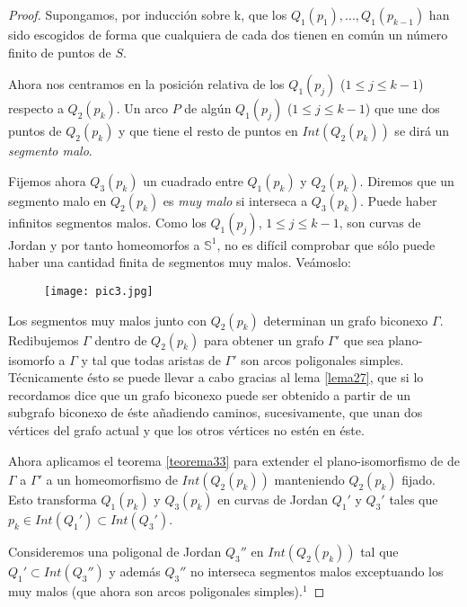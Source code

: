 \begin{proof}
	Supongamos, por inducción sobre k, que los $Q_{1}(p_{1}),...,Q_{1}(p_{k-1})$ han sido escogidos de forma que cualquiera de cada dos tienen en común un número finito de puntos de $S$. 

	Ahora nos centramos en la posición relativa de los $Q_{1}(p_j)$ ($1 \leq j \leq k-1$) respecto a $Q_{2}(p_k)$. Un arco $P$ de algún $Q_{1}(p_j)$ ($1 \leq j \leq k-1$) que une dos puntos de $Q_{2}(p_k)$ y que tiene el resto de puntos en $Int(Q_{2}(p_k))$ se dirá un 
 {\em segmento malo}. 
 
Fijemos ahora $Q_{3}(p_k)$ un cuadrado entre $Q_{1}(p_k)$ y $Q_{2}(p_k)$. Diremos que  un segmento malo en $Q_{2}(p_k)$ es {\em muy malo} si interseca a $Q_{3}(p_k)$. Puede haber infinitos segmentos malos. Como los $Q_{1}(p_{j})$, $1\leq j\leq k-1$, son curvas de Jordan y por tanto homeomorfos a $\mathbb{S}^1$, no es difícil comprobar que sólo puede haber una cantidad finita de segmentos muy malos. Veámoslo:

\begin{figure}[h]
\centering
\begin{minipage}[c]{\textwidth}
\centering
    \texttt{[image: pic3.jpg]}
\end{minipage}
\end{figure}

	Los segmentos muy malos junto con $Q_{2}(p_k)$ determinan un grafo biconexo $\Gamma$. Redibujemos $\Gamma$ dentro de $Q_{2}(p_k)$  para obtener un grafo $\Gamma'$ que sea plano-isomorfo a $\Gamma$ y tal que todas aristas de $\Gamma'$ son arcos poligonales simples. Técnicamente ésto se puede llevar a cabo gracias al lema \ref{lema27}, que si lo recordamos dice que un grafo biconexo puede ser obtenido a partir de un subgrafo biconexo de éste añadiendo caminos, sucesivamente, que unan dos vértices del grafo actual y que los otros vértices no estén en éste.

	Ahora aplicamos el teorema \ref{teorema33} para extender el plano-isomorfismo de de $\Gamma$ a $\Gamma'$ a un homeomorfismo de $\overline{Int(Q_{2}(p_k))}$ manteniendo $Q_{2}(p_k)$ fijado. Esto transforma $Q_{1}(p_k)$ y $Q_{3}(p_k)$ en curvas de Jordan $Q_{1}'$ y $Q_{3}'$ tales que $p_{k} \in Int(Q_{1}') \subset Int(Q_{3}')$.

	Consideremos una poligonal de Jordan $Q_{3}''$ en $Int(Q_{2}(p_k))$ tal que $Q_{1}' \subset Int(Q_{3}'')$ y además $Q_{3}''$ no interseca segmentos malos exceptuando los muy malos (que ahora son arcos poligonales simples).$^{1}$
	

\end{proof}
